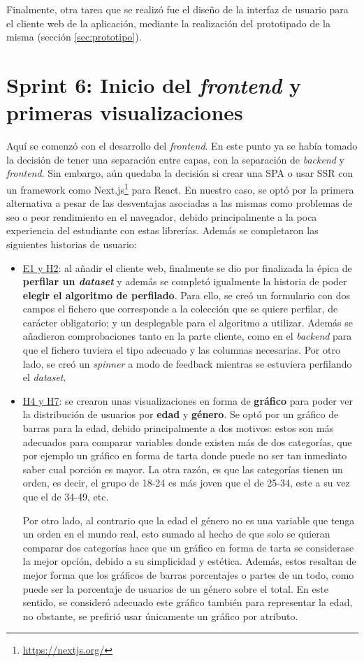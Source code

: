 Finalmente, otra tarea que se realizó fue el diseño de la interfaz de usuario para el cliente web de la aplicación, mediante la realización del prototipado de la misma (sección \ref{sec:prototipo}).

\section{Sprint 6: Inicio del \textit{frontend} y primeras visualizaciones}
Aquí se comenzó con el desarrollo del \textit{frontend}. En este punto ya se había tomado la decisión de tener una separación entre capas, con la separación de \textit{backend} y \textit{frontend}. Sin embargo, aún quedaba la decisión si crear una SPA o usar SSR con un framework como Next.js\footnote{\url{https://nextjs.org/}} para React. En nuestro caso, se optó por la primera alternativa a pesar de las desventajas asociadas a las mismas como problemas de \gls{seo} o peor rendimiento en el navegador, debido principalmente a la poca experiencia del estudiante con estas librerías. Además se completaron las siguientes historias de usuario:
\begin{itemize}
    \item \hyperref[tab:user-stories]{E1 y H2}: al añadir el cliente web, finalmente se dio por finalizada la épica de \textbf{perfilar un \textit{dataset}} y además se completó igualmente la historia de poder \textbf{elegir el algoritmo de perfilado}. Para ello, se creó un formulario con dos campos el fichero que corresponde a la colección que se quiere perfilar, de carácter obligatorio; y un desplegable para el algoritmo a utilizar. Además se añadieron comprobaciones tanto en la parte cliente, como en el \textit{backend} para que el fichero tuviera el tipo adecuado y las columnas necesarias. Por otro lado, se creó un \textit{spinner} a modo de feedback mientras se estuviera perfilando el \textit{dataset}.
    \item \hyperref[tab:user-stories]{H4 y H7}: se crearon unas visualizaciones en forma de \textbf{gráfico} para poder ver la distribución de usuarios por \textbf{edad} y \textbf{género}. Se optó por un gráfico de barras para la edad, debido principalmente a dos motivos: estos son más adecuados para comparar variables donde existen más de dos categorías, que por ejemplo un gráfico en forma de tarta donde puede no ser tan inmediato saber cual porción es mayor. La otra razón, es que las categorías tienen un orden, es decir, el grupo de 18-24 es más joven que el de 25-34, este a su vez que el de 34-49, etc.
    
    Por otro lado, al contrario que la edad el género no es una variable que tenga un orden en el mundo real, esto sumado al hecho de que solo se quieran comparar dos categorías hace que un gráfico en forma de tarta se considerase la mejor opción, debido a su simplicidad y estética. Además, estos resaltan de mejor forma que los gráficos de barras porcentajes o partes de un todo, como puede ser la porcentaje de usuarios de un género sobre el total. En este sentido, se consideró adecuado este gráfico también para representar la edad, no obstante, se prefirió usar únicamente un gráfico por atributo.
\end{itemize}

